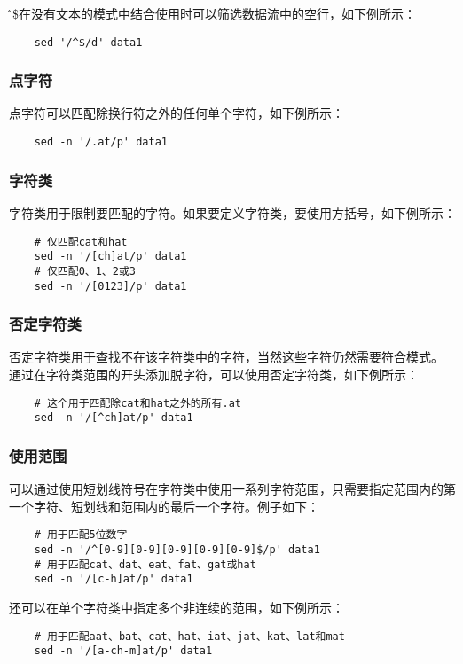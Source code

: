 \documentclass[a4paper,left=2.5cm,right=2.5cm,11pt]{article}
\begin{document}
	\^和\$在没有文本的模式中结合使用时可以筛选数据流中的空行，如下例所示：
	\begin{lstlisting}
	sed '/^$/d' data1
	\end{lstlisting}

\subsubsection{点字符}
	点字符可以匹配除换行符之外的任何单个字符，如下例所示：
	\begin{lstlisting}
	sed -n '/.at/p' data1
	\end{lstlisting}

\subsubsection{字符类}
	字符类用于限制要匹配的字符。如果要定义字符类，要使用方括号，如下例所示：
	\begin{lstlisting}
	# 仅匹配cat和hat
	sed -n '/[ch]at/p' data1
	# 仅匹配0、1、2或3
	sed -n '/[0123]/p' data1
	\end{lstlisting}

\subsubsection{否定字符类}
	否定字符类用于查找不在该字符类中的字符，当然这些字符仍然需要符合模式。
	通过在字符类范围的开头添加脱字符，可以使用否定字符类，如下例所示：
	\begin{lstlisting}
	# 这个用于匹配除cat和hat之外的所有.at
	sed -n '/[^ch]at/p' data1
	\end{lstlisting}

\subsubsection{使用范围}
	可以通过使用短划线符号在字符类中使用一系列字符范围，只需要指定范围内的第一个字符、短划线和范围内的最后一个字符。例子如下：
	\begin{lstlisting}
	# 用于匹配5位数字
	sed -n '/^[0-9][0-9][0-9][0-9][0-9]$/p' data1
	# 用于匹配cat、dat、eat、fat、gat或hat
	sed -n '/[c-h]at/p' data1
	\end{lstlisting}

	还可以在单个字符类中指定多个非连续的范围，如下例所示：
	\begin{lstlisting}
	# 用于匹配aat、bat、cat、hat、iat、jat、kat、lat和mat
	sed -n '/[a-ch-m]at/p' data1
	\end{lstlisting}
\end{document}
